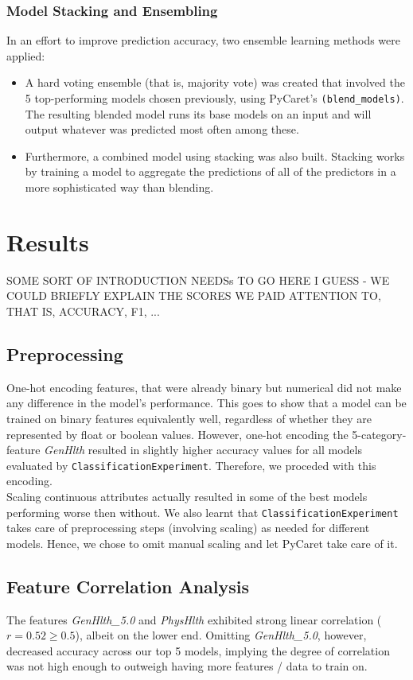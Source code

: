 \documentclass[a4paper,12pt]{article}
\begin{document}
\subsubsection{Model Stacking and Ensembling}
In an effort to improve prediction accuracy, two ensemble learning methods were applied:
\begin{itemize}
    \item A hard voting ensemble (that is, majority vote) was created that involved 
    the 5 top-performing models chosen previously, using PyCaret's \texttt{(blend\_models)}. 
    The resulting blended model runs its base models on an input
    and will output whatever was predicted most often among these.
    \item Furthermore, a combined model using stacking was also built. 
    Stacking works by training a model to aggregate the predictions of all of the predictors in a more
    sophisticated way than blending.
\end{itemize} 

\section{Results}
SOME SORT OF INTRODUCTION NEEDSs TO GO HERE I GUESS - WE COULD BRIEFLY EXPLAIN THE SCORES WE PAID ATTENTION TO,
THAT IS, ACCURACY, F1, ...

\subsection{Preprocessing}
One-hot encoding features, that were already binary but numerical did not make any difference in the model's
performance. This goes to show that a model can be trained on binary features equivalently well, regardless
of whether they are represented by float or boolean values. However, one-hot encoding the 5-category-feature
\textit{GenHlth} resulted in slightly higher accuracy values for all models evaluated by \texttt{ClassificationExperiment}.
Therefore, we proceded with this encoding.
\\
Scaling continuous attributes actually resulted in some of the best models performing worse then without.
We also learnt that \texttt{ClassificationExperiment} takes care of preprocessing steps (involving scaling)
as needed for different models. Hence, we chose to omit manual scaling and let PyCaret take care of it.

\subsection{Feature Correlation Analysis}
The features \textit{GenHlth\_5.0} and \textit{PhysHlth} exhibited strong linear correlation ($r = 0.52 \geq 0.5$),
albeit on the lower end. Omitting \textit{GenHlth\_5.0}, however, decreased accuracy across our top 5 models,
implying the degree of correlation was not high enough to outweigh having more features / data to train 
on.
\end{document}
